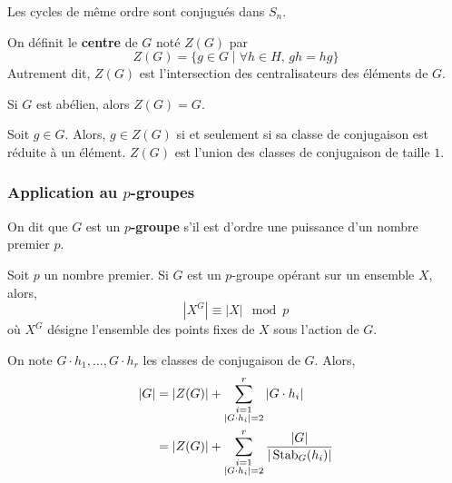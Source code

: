	\begin{example}
		Les cycles de même ordre sont conjugués dans $S_n$.
	\end{example}


	\begin{definition}
		On définit le \textbf{centre} de $G$ noté $Z(G)$ par
		\[ Z(G) = \{ g \in G \mid \forall h \in H, \, gh=hg \} \]
		Autrement dit, $Z(G)$ est l'intersection des centralisateurs des éléments de $G$.
	\end{definition}

	\begin{example}
		Si $G$ est abélien, alors $Z(G) = G$.
	\end{example}


	\begin{proposition}
		Soit $g \in G$. Alors, $g \in Z(G)$ si et seulement si sa classe de conjugaison est réduite à un élément.
		\newpar
		$Z(G)$ est l'union des classes de conjugaison de taille $1$.
	\end{proposition}

	\subsubsection{Application au \texorpdfstring{$p$}{p}-groupes}

	\reference[ROM21]{22}

	\begin{definition}
		On dit que $G$ est un \textbf{$p$-groupe} s'il est d'ordre une puissance d'un nombre premier $p$.
	\end{definition}

	\begin{proposition}
		Soit $p$ un nombre premier. Si $G$ est un $p$-groupe opérant sur un ensemble $X$, alors,
		\[ |X^G| \equiv |X| \mod p \]
		où $X^G$ désigne l'ensemble des points fixes de $X$ sous l'action de $G$.
	\end{proposition}

	\begin{corollary}
		On note $G \cdot h_1, \dots, G \cdot h_r$ les classes de conjugaison de $G$. Alors,
		\begin{align*}
			\vert G \vert &= \vert Z(G) \vert + \sum_{\substack{i=1 \\ \vert G \cdot h_i \vert = 2}}^{r} \vert G \cdot h_i \vert \\
			&= \vert Z(G) \vert + \sum_{\substack{i=1 \\ \vert G \cdot h_i \vert = 2}}^{r} \frac{\vert G \vert}{\vert \operatorname{Stab}_G(h_i) \vert}
		\end{align*}
	\end{corollary}

